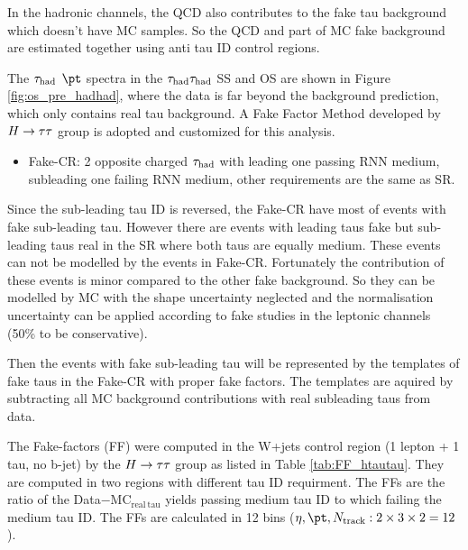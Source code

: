 In the hadronic channels, the QCD also contributes to the fake tau background which doesn't have MC samples. So the QCD and part of MC fake background are estimated together using anti tau ID control regions.

The $\tau_\text{had}$ $\pt$ spectra in the $\tau_\text{had}{}\tau_\text{had}$ SS and OS are shown in Figure \ref{fig:os_pre_hadhad}, where the data is far beyond the background prediction, which only contains real tau background. A Fake Factor Method developed by $H \rightarrow \tau\tau$ group \cite{Htautau-note} is adopted and customized for this analysis. 



\begin{itemize}
\item{Fake-CR: 2 opposite charged $\tau_\text{had}$ with leading one passing RNN medium, subleading one failing RNN medium, other requirements are the same as SR.}
\end{itemize}

Since the sub-leading tau ID is reversed, the Fake-CR have most of events with fake sub-leading tau. However there are events with leading taus fake but sub-leading taus real in the SR where both taus are equally medium. These events can not be modelled by the events in Fake-CR. Fortunately the contribution of these events is minor compared to the other fake background. So they can be modelled by MC with the shape uncertainty neglected and the normalisation uncertainty can be applied according to fake studies in the leptonic channels (50\% to be conservative).

Then the events with fake sub-leading tau will be represented by the templates of fake taus in the Fake-CR with proper fake factors. The templates are aquired by subtracting all MC background contributions with real subleading taus from data.

The Fake-factors (FF) were computed in the W+jets control region (1 lepton + 1 tau, no b-jet) by the $H \rightarrow \tau\tau$ group \cite{Htautau-note} as listed in Table \ref{tab:FF_htautau}. They are computed in two regions with different tau ID requirment. The FFs are the ratio of the Data$-$MC$_\mathrm{real~tau}$ yields passing medium tau ID to which failing the medium tau ID. The FFs are calculated in 12 bins ($\eta,\pt,N_\mathrm{track}:2\times3\times2=12$).

